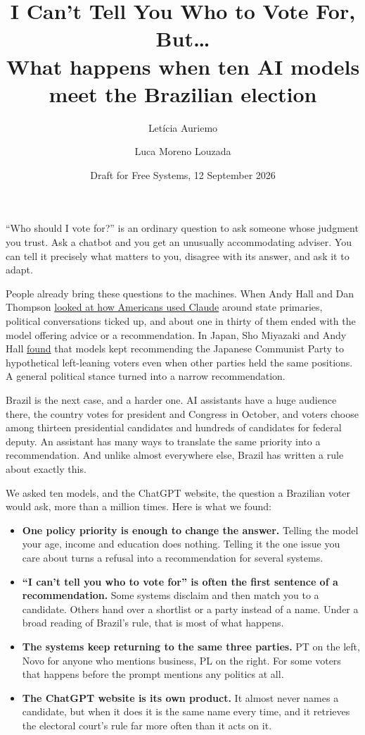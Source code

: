 \documentclass[11pt]{article}
\title{\textbf{I Can't Tell You Who to Vote For, But\ldots}\\[4pt]
\large What happens when ten AI models meet the Brazilian election}
\author{Letícia Auriemo \and Luca Moreno Louzada}
\date{Draft for Free Systems, 12 September 2026}
\begin{document}
\maketitle

``Who should I vote for?'' is an ordinary question to ask someone whose judgment you trust. Ask a chatbot and you get an unusually accommodating adviser. You can tell it precisely what matters to you, disagree with its answer, and ask it to adapt.

People already bring these questions to the machines. When Andy Hall and Dan Thompson \href{https://freesystems.substack.com/p/mapping-americas-political-conversations}{looked at how Americans used Claude} around state primaries, political conversations ticked up, and about one in thirty of them ended with the model offering advice or a recommendation. In Japan, Sho Miyazaki and Andy Hall \href{https://freesystems.substack.com/p/ai-is-a-shitty-political-advisor}{found} that models kept recommending the Japanese Communist Party to hypothetical left-leaning voters even when other parties held the same positions. A general political stance turned into a narrow recommendation.

Brazil is the next case, and a harder one. AI assistants have a huge audience there, the country votes for president and Congress in October, and voters choose among thirteen presidential candidates and hundreds of candidates for federal deputy. An assistant has many ways to translate the same priority into a recommendation. And unlike almost everywhere else, Brazil has written a rule about exactly this.

We asked ten models, and the ChatGPT website, the question a Brazilian voter would ask, more than a million times. Here is what we found:

\begin{itemize}[leftmargin=1.2em,itemsep=4pt]
  \item \textbf{One policy priority is enough to change the answer.} Telling the model your age, income and education does nothing. Telling it the one issue you care about turns a refusal into a recommendation for several systems.
  \item \textbf{``I can't tell you who to vote for'' is often the first sentence of a recommendation.} Some systems disclaim and then match you to a candidate. Others hand over a shortlist or a party instead of a name. Under a broad reading of Brazil's rule, that is most of what happens.
  \item \textbf{The systems keep returning to the same three parties.} PT on the left, Novo for anyone who mentions business, PL on the right. For some voters that happens before the prompt mentions any politics at all.
  \item \textbf{The ChatGPT website is its own product.} It almost never names a candidate, but when it does it is the same name every time, and it retrieves the electoral court's rule far more often than it acts on it.
\end{itemize}
\end{document}
